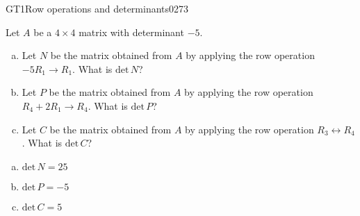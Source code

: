\begin{exercise}{GT1}{Row operations and determinants}{0273} 
\begin{exerciseStatement} 

Let \(A\) be a \(4 \times 4\) matrix with determinant \(-5\).

 

\begin{enumerate}[(a)]
\item Let \(N\) be the matrix obtained from \(A\) by applying the row operation \(-5 R_1 \to R_1\). What is \(\mathrm{det}\,N\)?
\item Let \(P\) be the matrix obtained from \(A\) by applying the row operation \(R_4 + 2 R_1 \to R_4\). What is \(\mathrm{det}\,P\)?
\item Let \(C\) be the matrix obtained from \(A\) by applying the row operation \(R_3 \leftrightarrow R_4\). What is \(\mathrm{det}\,C\)?
\end{enumerate}

     \end{exerciseStatement}
 \begin{exerciseAnswer} 

\begin{enumerate}[(a)]
\item \(\mathrm{det}\,N=25\)
\item \(\mathrm{det}\,P=-5\)
\item \(\mathrm{det}\,C=5\)
\end{enumerate}

     \end{exerciseAnswer}
 \end{exercise}




